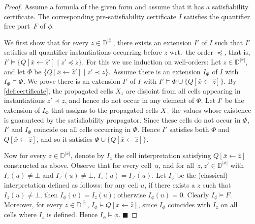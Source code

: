 \documentclass[runningheads]{llncs}
\newcommand{\qedhere}{$\blacksquare$}
\newcommand{\numvar}[1]{|#1|}
\newcommand{\domain}{\mathbb{D}}
\newcommand{\subst}[3]{#1[#2\leftarrow #3]}
\newcommand{\repr}[1]{\hat{#1}}
\begin{document}
\begin{proof}
	Assume a formula of the given form and assume that it  has a satisfiability certificate.
	The corresponding pre-satisfiability certificate $I$ satisfies the quantifier free part~$F$ of $\phi$.
    
    We first show that for every $z\in\domain^{\numvar{\bar{x}}}$, there exists an extension $I'$ of $I$ such that $I'$ satisfies all quantifier instantiations occurring before $z$ wrt.\ the order $\preceq$, that is,  $I'\models\{ \subst{Q}{\bar{x}}{\repr{z}'} \mid z'\preceq z\}$. For this we use induction on well-orders: Let $z\in\domain^{\numvar{\bar{x}}}$, and let $\Phi$ be $\{ \subst{Q}{\bar{x}}{\repr{z}'} \mid z'\prec z\}$. Assume there is an extension $I_{\Phi}$ of $I$ with $I_{\Phi}\models\Phi$. We prove there is an extension $I'$ of $I$ with $I'\models\Phi\cup \{ \subst{Q}{\bar{x}}{\repr{z}}\}$. %
    By \cref{def:certificate}, the propagated cells $X_z$ are disjoint from all cells appearing in instantiations $z' \prec z$, and hence do not occur in any element of $\Phi$. Let $I'$ be the extension of $I_{\Phi}$ that assigns to the propagated cells $X_z$ the values whose existence is guaranteed by the satisfiability propagator. Since these cells do not occur in $\Phi$, $I'$ and $I_{\Phi}$ coincide on all cells occurring in $\Phi$. Hence $I'$ satisfies both $\Phi$ and $\subst{Q}{\bar{x}}{\repr{z}}$, and so it satisfies $\Phi\cup \{ \subst{Q}{\bar{x}}{\repr{z}}\}$.

	Now for every $z\in\domain^{\numvar{\bar{x}}}$, denote by $I_z$ the cell interpretation satisfying $\subst{Q}{\bar{x}}{\repr{z}}$ constructed as above.
    Observe that for every cell~$u$, and for all~$z, z'\in \domain^{\numvar{\bar{x}}}$ with $I_z(u)\neq \bot$ and $I_{z'}(u)\neq \bot$, $I_z(u)=I_{z'}(u)$. Let $I_\phi$ be the (classical) interpretation defined as follows: for any cell $u$, if there exists a $z$ such that $I_z(u)\neq \bot$, then $I_\phi(u)=I_z(u)$; otherwise $I_\phi(u)=0$. Clearly $I_\phi\models F$. Moreover, for every $z\in\domain^{\numvar{\bar{x}}}$,  $I_\phi\models  \subst{Q}{\bar{x}}{\repr{z}}$, since $I_\phi$ coincides with $I_z$ on all cells where $I_z$ is defined. Hence  $I_\phi\models \phi$.
\qedhere\end{proof}
\end{document}
